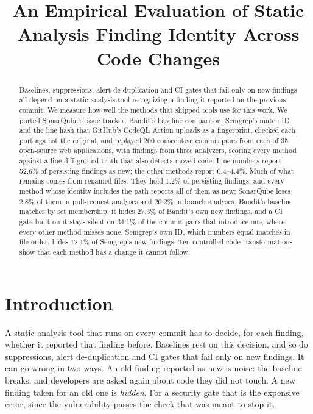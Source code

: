 \documentclass[conference]{IEEEtran}
\newif\ifanon
\begin{document}
\title{An Empirical Evaluation of Static Analysis Finding Identity Across Code
Changes}

\ifanon
\author{\IEEEauthorblockN{Anonymous Author(s)}}
\else
\author{
}
\fi

\maketitle

\begin{abstract}
Baselines, suppressions, alert de-duplication and CI gates that fail only on new
findings all depend on a
static analysis tool recognizing a finding it reported on the previous commit. We
measure how well the methods that shipped tools use for this work. We ported
SonarQube's issue tracker, Bandit's baseline comparison, Semgrep's match ID and the line
hash that GitHub's CodeQL Action uploads as a fingerprint, checked each port against the original, and
replayed 200 consecutive commit pairs from each of 35 open-source web
applications, with findings from three analyzers, scoring every method against a line-diff ground truth that also detects
moved code. Line numbers report
52.6\% of persisting findings as new; the other methods report 0.4--4.4\%. Much of what
remains comes from renamed files. They hold 1.2\% of persisting findings, and every
method whose identity includes the path reports all of them as new; SonarQube loses
2.8\% of them in pull-request analyses and 20.2\% in branch analyses. Bandit's baseline
matches by set membership: it hides 27.3\% of Bandit's own new findings, and a CI gate
built on it stays silent on 34.1\% of the commit pairs that introduce one, where every
other method misses none. Semgrep's own ID, which numbers equal matches in file order,
hides 12.1\% of Semgrep's new findings. Ten controlled code transformations show that each method has
a change it cannot follow.
\end{abstract}

\section{Introduction}

A static analysis tool that runs on every commit has to decide, for each finding,
whether it reported that finding before. Baselines rest on this decision, and so do
suppressions, alert de-duplication and CI gates that fail only on new findings. It can
go wrong in two ways. An old finding reported as new is noise: the baseline breaks, and
developers are asked again about code they did not touch. A new finding taken for an
old one is \emph{hidden}. For a security gate that is the expensive error, since the
vulnerability passes the check that was meant to stop it.
\end{document}
